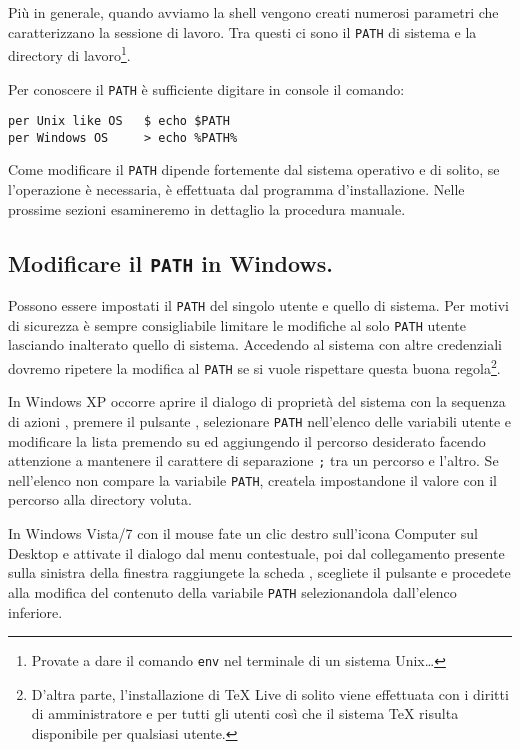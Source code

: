 Più in generale, quando avviamo la shell vengono creati numerosi parametri che
caratterizzano la sessione di lavoro. Tra questi ci sono il \texttt{PATH} di
sistema e la directory di lavoro\footnote{Provate a dare il comando \texttt{env}
nel terminale di un sistema Unix\dots}.

Per conoscere il \texttt{PATH} è sufficiente digitare in console il comando:
\begin{verbatim}
per Unix like OS   $ echo $PATH
per Windows OS     > echo %PATH%
\end{verbatim}

Come modificare il \texttt{PATH} dipende fortemente dal sistema operativo e di
solito, se l'operazione è necessaria, è effettuata dal programma
d'installazione. Nelle prossime sezioni esamineremo in dettaglio la procedura
manuale.

\subsection{Modificare il \texttt{PATH} in Windows.}

Possono essere impostati il \texttt{PATH} del singolo utente e quello di
sistema. Per motivi di sicurezza è sempre consigliabile limitare le modifiche al
solo \texttt{PATH} utente lasciando inalterato quello di sistema. Accedendo al
sistema con altre credenziali dovremo ripetere la modifica al \texttt{PATH} se
si vuole rispettare questa buona regola\footnote{D'altra parte, l'installazione
di \TeX{} Live di solito viene effettuata con i diritti di amministratore e per
tutti gli utenti così che il sistema \TeX{} risulta disponibile per qualsiasi
utente.}.

In Windows XP occorre aprire il dialogo di proprietà del sistema con la sequenza
di azioni , premere il
pulsante , selezionare \texttt{PATH} nell'elenco
delle variabili utente e modificare la lista premendo su  ed
aggiungendo il percorso desiderato facendo attenzione a mantenere il carattere
di separazione \texttt{;} tra un percorso e l'altro. Se nell'elenco non compare
la variabile \texttt{PATH}, createla impostandone il valore con il percorso alla
directory voluta.

In Windows Vista/7 con il mouse fate un clic destro sull'icona Computer sul
Desktop e attivate il dialogo  dal menu contestuale, poi dal
collegamento presente sulla sinistra della finestra  raggiungete la scheda , scegliete il pulsante
 e procedete alla modifica del contenuto della
variabile \texttt{PATH} selezionandola dall'elenco inferiore.

